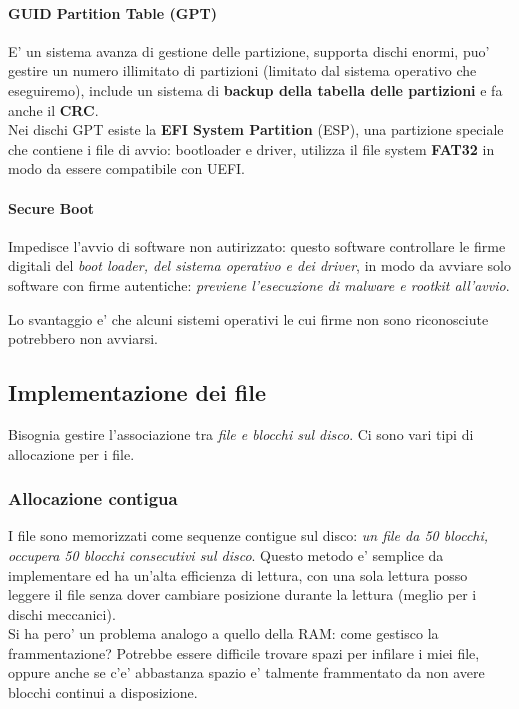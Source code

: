 \paragraph{GUID Partition Table (GPT)}
E' un sistema avanza di gestione delle partizione, supporta dischi enormi, 
puo' gestire un numero illimitato di partizioni (limitato dal sistema operativo che eseguiremo), include un sistema
di \textbf{backup della tabella delle partizioni} e fa anche il \textbf{CRC}. \\

Nei dischi GPT esiste la \textbf{EFI System Partition} (ESP), una partizione speciale che contiene i file di avvio: bootloader e driver, utilizza
il file system \textbf{FAT32} in modo da essere compatibile con UEFI. 

\paragraph{Secure Boot}
Impedisce l'avvio di software non autirizzato: questo software controllare le firme digitali
del \textit{boot loader, del sistema operativo e dei driver}, in modo da avviare solo software con firme
autentiche: \textit {previene l'esecuzione di malware e rootkit all'avvio}.

Lo svantaggio e' che alcuni sistemi operativi le cui firme non sono riconosciute potrebbero non avviarsi.

\subsection{Implementazione dei file}
Bisognia gestire l'associazione tra \textit{file e blocchi sul disco}. Ci sono vari tipi di allocazione 
per i file.

\subsubsection{Allocazione contigua}
I file sono memorizzati come sequenze contigue sul disco: \textit{un file da 50 blocchi, occupera 50 blocchi
consecutivi sul disco}.
Questo metodo e' semplice da implementare ed ha un'alta efficienza di lettura, con una sola lettura posso leggere il file
senza dover cambiare posizione durante la lettura (meglio per i dischi meccanici).  \\

Si ha pero' un problema analogo a quello della RAM: come gestisco la frammentazione? Potrebbe essere 
difficile trovare spazi per infilare i miei file, oppure anche se c'e' abbastanza spazio e' talmente frammentato
da non avere blocchi continui a disposizione.


